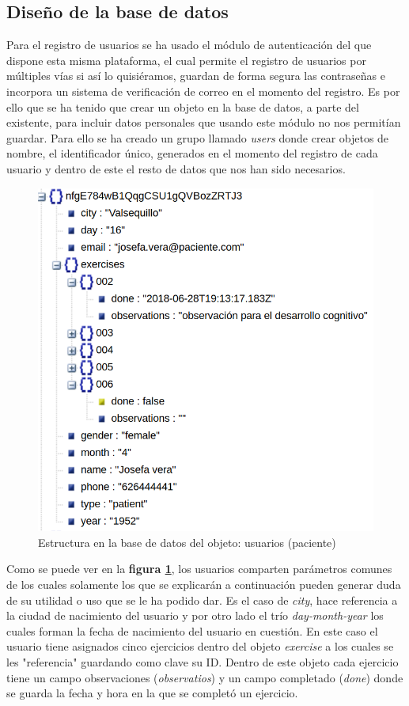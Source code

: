 \subsection{Diseño de la base de datos}
\medskip
Para el registro de usuarios se ha usado el módulo de autenticación
del que dispone esta misma plataforma, el cual permite el registro
de usuarios por múltiples vías si así lo quisiéramos, guardan de
forma segura las contraseñas e incorpora un sistema de verificación
de correo en el momento del registro. Es por ello que se ha tenido
que crear un objeto en la base de datos, a parte del existente,
para incluir datos personales que usando este módulo no nos permitían
guardar. Para ello se ha creado un grupo llamado \textit{users} donde
crear objetos de nombre, el identificador único, generados en el
momento del registro de cada usuario y dentro de este el resto de
datos que nos han sido necesarios.

\medskip
\begin{figure}
    \includegraphics[width=\linewidth]{./images/database/user-patient.png}
    \caption{Estructura en la base de datos del objeto: usuarios (paciente)}
    \label{user-patient}
\end{figure}

Como se puede ver en la \textbf{figura \ref{user-patient}},
los usuarios comparten parámetros comunes de los cuales solamente los que
se explicarán a continuación pueden generar duda de su utilidad o uso que se
le ha podido dar. Es el caso de \textit{city}, hace referencia a la ciudad de
nacimiento del usuario y por otro lado el trío \textit{day-month-year} los
cuales forman la fecha de nacimiento del usuario en cuestión.
En este caso el usuario tiene asignados cinco ejercicios dentro del objeto
\textit{exercise} a los cuales se les "referencia" guardando como clave su ID.
Dentro de este objeto cada ejercicio tiene un campo observaciones
(\textit{observatios}) y un campo completado (\textit{done}) donde se guarda
la fecha y hora en la que se completó un ejercicio.

